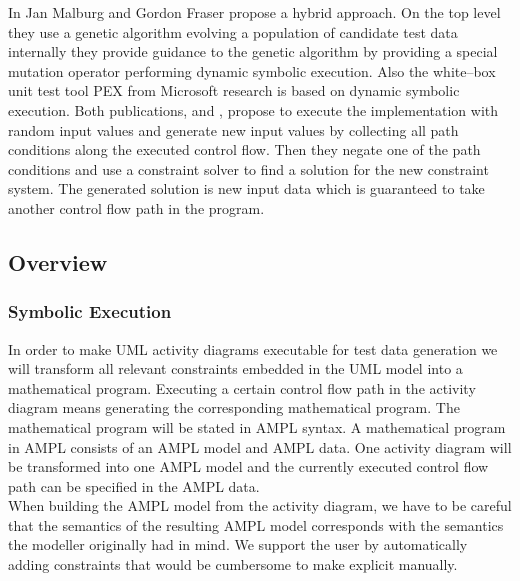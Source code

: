 \documentclass[runningheads,a4paper]{llncs}%
\begin{document}
In \cite{malburg2011combining} Jan Malburg and Gordon Fraser propose a hybrid approach. On the top level they use a genetic algorithm evolving a population of candidate test data internally they provide guidance to the genetic algorithm by providing a special mutation operator performing dynamic symbolic execution. Also the white--box unit test tool PEX \cite{pex} from Microsoft\textsuperscript{\textregistered} research is based on dynamic symbolic execution. Both publications, \cite{malburg2011combining} and \cite{pex}, propose to execute the implementation with random input values and generate new input values by collecting all path conditions along the executed control flow. Then they negate one of the path conditions and use a constraint solver to find a solution for the new constraint system. The generated solution is new input data which is guaranteed to take another control flow path in the program.\\%
\subsection{Overview}%
\subsubsection{Symbolic Execution}
In order to make UML activity diagrams executable for test data generation we will transform all relevant constraints embedded in the UML model into a mathematical program. Executing a certain control flow path in the activity diagram means generating the corresponding mathematical program. The mathematical program will be stated in AMPL syntax. A mathematical program in AMPL consists of an AMPL model and AMPL data. One activity diagram will be transformed into one AMPL model and the currently executed control flow path can be specified in the AMPL data.\\
When building the AMPL model from the activity diagram, we have to be careful that the semantics of the resulting AMPL model corresponds with the semantics the modeller originally had in mind. We support the user by automatically adding constraints that would be cumbersome to make explicit manually.
\end{document}
